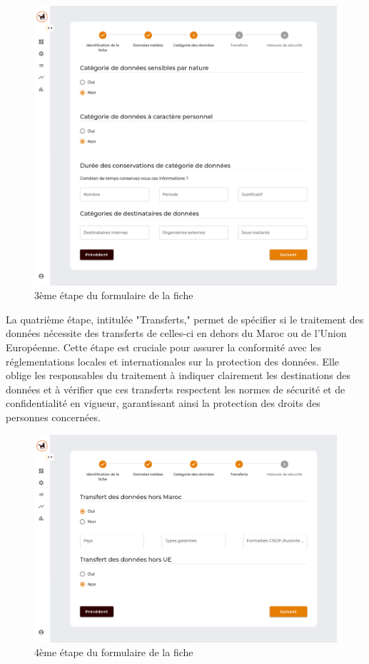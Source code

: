\begin{figure}[H]
    \centering
    \includegraphics[width=\textwidth]{images/guis/nouvelle-fiche/nouvelle-fiche-3.png} 
    \caption{3ème étape du formulaire de la fiche}
\end{figure}
    
\clearpage

\noindent La quatrième étape, intitulée "Transferts," permet de spécifier si le traitement des données nécessite des transferts de celles-ci en dehors du Maroc ou de l'Union Européenne. Cette étape est cruciale pour assurer la conformité avec les réglementations locales et internationales sur la protection des données. Elle oblige les responsables du traitement à indiquer clairement les destinations des données et à vérifier que ces transferts respectent les normes de sécurité et de confidentialité en vigueur, garantissant ainsi la protection des droits des personnes concernées. \\

\begin{figure}[H]
    \centering
    \includegraphics[width=\textwidth]{images/guis/nouvelle-fiche/nouvelle-fiche-4.png} 
    \caption{4ème étape du formulaire de la fiche}
\end{figure}

